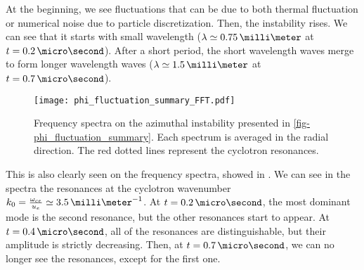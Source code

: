     At the beginning, we see fluctuations that can be due to both thermal fluctuation \citep{salpeter1960} or numerical noise due to particle discretization.
    Then, the instability rises.
    We can see that it starts with small wavelength ($\lambda \simeq 0.75\,\milli\meter$ at $t=0.2\,\micro\second$).
    After a short period, the short wavelength waves merge to form longer wavelength waves  ($\lambda \simeq 1.5\,\milli\meter$ at $t=0.7\,\micro\second$).
    
    
    \begin{figure}[!hbt]
      \centering
      \texttt{[image: phi\_fluctuation\_summary\_FFT.pdf]}
      \caption{Frequency spectra on the azimuthal instability presented in \cref{fig-phi_fluctuation_summary}. Each spectrum is averaged in the radial direction. The red dotted lines represent the cyclotron resonances.}
      \label{fig-phi_fluctuation_summary_FFT}
    \end{figure}
    
    This is also clearly seen on the frequency spectra, showed in .
    We can see in the spectra the resonances at the cyclotron wavenumber $k_0 = \frac{\oce}{u_e} \simeq 3.5\,\milli\meter^{-1}$.
    At $t=0.2\,\micro\second$, the most dominant mode is the second resonance, but the other resonances start to appear.
    At $t=0.4\,\micro\second$, all of the resonances are distinguishable, but their amplitude is strictly decreasing.
    Then, at $t=0.7\,\micro\second$, we can no longer see the resonances, except for the first one.
    
